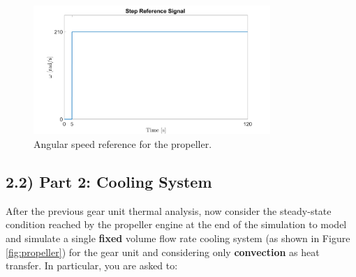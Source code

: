 \documentclass[11pt,a4paper,oneside]{article}
\begin{document}
    \begin{figure}[h!]
\centering
\includegraphics[width=0.8\textwidth]{gfx/ReferenceSignal.png}
\caption{\label{fig:refsignal} Angular speed reference for the propeller.}
\end{figure}



\subsection*{2.2) Part 2: Cooling System}
After the previous gear unit thermal analysis, now consider the steady-state condition reached 
by the propeller engine at the end of the simulation to model and simulate a single \textbf{fixed}
 volume flow rate cooling system (as shown in Figure \ref{fig:propeller}) for the gear unit and 
 considering only \textbf{convection} as heat transfer. In particular, you are asked to:
\end{document}
